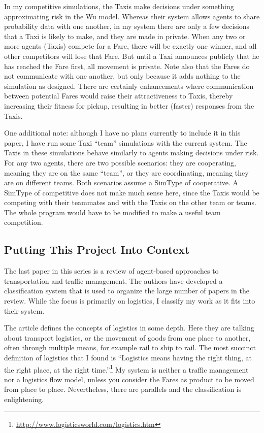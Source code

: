 \documentclass[11pt,letterpaper,onecolumn,twoside,openright,final]{report}
\begin{document}
In my competitive simulations, the Taxis make decisions under something approximating risk in the Wu model.
Whereas their system allows agents to share probability data with one another, in my system there are only a few decisions that a Taxi is likely to make, and they are made in private.
When any two or more agents (Taxis) compete for a Fare, there will be exactly one winner, and all other competitors will lose that Fare.
But until a Taxi announces publicly that he has reached the Fare first, all movement is private.
Note also that the Fares do not communicate with one another, but only because it adds nothing to the simulation as designed.
There are certainly enhancements where communication between potential Fares would raise their attractiveness to Taxis, thereby increasing their fitness for pickup, resulting in better (faster) responses from the Taxis.

One additional note: although I have no plans currently to include it in this paper, I have run some Taxi ``team'' simulations with the current system.
The Taxis in these simulations behave similarly to agents making decisions under risk.
For any two agents, there are two possible scenarios: they are cooperating, meaning they are on the same ``team'', or they are coordinating, meaning they are on different teams.
Both scenarios assume a SimType of cooperative.
A SimType of competitive does not make much sense here, since the Taxis would be competing with their teammates and with the Taxis on the other team or teams.
The whole program would have to be modified to make a useful team competition.

\subsection{Putting This Project Into Context}
The last paper in this series is a review of agent-based approaches to transportation and traffic management.
The authors have developed a classification system that is used to organize the large number of papers in the review.
While the focus is primarily on logistics, I classify my work as it fits into their system.

The article defines the concepts of logistics in some depth.
Here they are talking about transport logistics, or the movement of goods from one place to another, often through multiple means, for example rail to ship to rail.
The most succinct definition of logistics that I found is ``Logistics means having the right thing, at the right place, at the right time.''\footnote{\url{http://www.logisticsworld.com/logistics.htm}}
My system is neither a traffic management nor a logistics flow model, unless you consider the Fares as product to be moved from place to place.
Nevertheless, there are parallels and the classification is enlightening.
\end{document}
